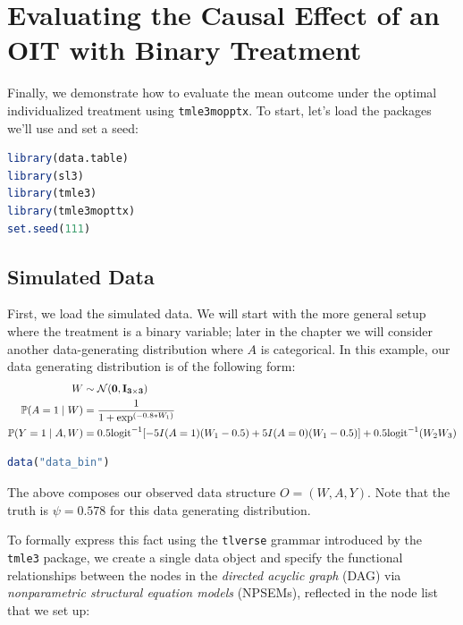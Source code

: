 \documentclass[
  12pt, krantz2,
]{krantz}
\newcommand{\passthrough}[1]{#1}
\theoremstyle{definition}
\theoremstyle{definition}
\theoremstyle{definition}
\renewcommand{\P}{\mathbb{P}}
\newcommand{\1}{\mathbbm{1}}
\begin{document}
\hypertarget{oit-eval-bin}{%
\section{Evaluating the Causal Effect of an OIT with Binary Treatment}\label{oit-eval-bin}}

Finally, we demonstrate how to evaluate the mean outcome under the optimal
individualized treatment using \passthrough{\lstinline!tmle3mopptx!}. To start, let's load the packages
we'll use and set a seed:

\begin{lstlisting}[language=R]
library(data.table)
library(sl3)
library(tmle3)
library(tmle3mopttx)
set.seed(111)
\end{lstlisting}

\hypertarget{simulated-data}{%
\subsection{Simulated Data}\label{simulated-data}}

First, we load the simulated data. We will start with the more general setup
where the treatment is a binary variable; later in the chapter we will consider
another data-generating distribution where \(A\) is categorical. In this example,
our data generating distribution is of the following form:
\begin{align*}
  W &\sim \mathcal{N}(\bf{0},I_{3 \times 3})\\
  \P(A=1 \mid W) &= \frac{1}{1+\exp^{(-0.8*W_1)}}\\
  \P(Y=1 \mid A,W) &= 0.5\text{logit}^{-1}[-5I(A=1)(W_1-0.5)+5I(A=0)(W_1-0.5)] +
     0.5\text{logit}^{-1}(W_2W_3)
\end{align*}

\begin{lstlisting}[language=R]
data("data_bin")
\end{lstlisting}

The above composes our observed data structure \(O = (W, A, Y)\). Note that the
truth is \(\psi=0.578\) for this data generating distribution.

To formally express this fact using the \passthrough{\lstinline!tlverse!} grammar introduced by the
\passthrough{\lstinline!tmle3!} package, we create a single data object and specify the functional
relationships between the nodes in the \emph{directed acyclic graph} (DAG) via
\emph{nonparametric structural equation models} (NPSEMs), reflected in the node list
that we set up:
\end{document}
